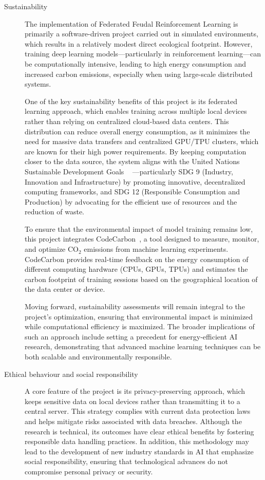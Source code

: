 \documentclass[12pt,a4paper,twoside,openany]{book}
\begin{document}
\begin{description}
    \item[Sustainability] The implementation of Federated Feudal Reinforcement Learning is primarily a software-driven project carried out in simulated environments, which results in a relatively modest direct ecological footprint. However, training deep learning models—particularly in reinforcement learning—can be computationally intensive, leading to high energy consumption and increased carbon emissions, especially when using large-scale distributed systems.

One of the key sustainability benefits of this project is its federated learning approach, which enables training across multiple local devices rather than relying on centralized cloud-based data centers. This distribution can reduce overall energy consumption, as it minimizes the need for massive data transfers and centralized GPU/TPU clusters, which are known for their high power requirements. By keeping computation closer to the data source, the system aligns with the United Nations Sustainable Development Goals ~\cite{UN_SDGs} —particularly SDG 9 (Industry, Innovation and Infrastructure) by promoting innovative, decentralized computing frameworks, and SDG 12 (Responsible Consumption and Production) by advocating for the efficient use of resources and the reduction of waste.

To ensure that the environmental impact of model training remains low, this project integrates CodeCarbon~\cite{CodeCarbon}, a tool designed to measure, monitor, and optimize CO$_2$ emissions from machine learning experiments. CodeCarbon provides real-time feedback on the energy consumption of different computing hardware (CPUs, GPUs, TPUs) and estimates the carbon footprint of training sessions based on the geographical location of the data center or device.

Moving forward, sustainability assessments will remain integral to the project's optimization, ensuring that environmental impact is minimized while computational efficiency is maximized. The broader implications of such an approach include setting a precedent for energy-efficient AI research, demonstrating that advanced machine learning techniques can be both scalable and environmentally responsible.

    \item[Ethical behaviour and social responsibility] A core feature of the project is its privacy-preserving approach, which keeps sensitive data on local devices rather than transmitting it to a central server. This strategy complies with current data protection laws and helps mitigate risks associated with data breaches. Although the research is technical, its outcomes have clear ethical benefits by fostering responsible data handling practices. In addition, this methodology may lead to the development of new industry standards in AI that emphasize social responsibility, ensuring that technological advances do not compromise personal privacy or security.


\end{description}
\end{document}
